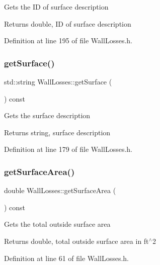 Gets the ID of surface description \begin{DoxyReturn}{Returns}
double, ID of surface description 
\end{DoxyReturn}


Definition at line 195 of file Wall\+Losses.\+h.

\mbox{\label{class_wall_losses_a10f5de20dc6fead726adbf62a9c49b09}} 
\subsubsection{\texorpdfstring{get\+Surface()}{getSurface()}}
{\footnotesize\ttfamily std\+::string Wall\+Losses\+::get\+Surface (\begin{DoxyParamCaption}{ }\end{DoxyParamCaption}) const\hspace{0.3cm}{\ttfamily [inline]}}

Gets the surface description \begin{DoxyReturn}{Returns}
string, surface description 
\end{DoxyReturn}


Definition at line 179 of file Wall\+Losses.\+h.

\mbox{\label{class_wall_losses_ad4d3aa549cc7ab19e927823dbafed973}} 
\subsubsection{\texorpdfstring{get\+Surface\+Area()}{getSurfaceArea()}}
{\footnotesize\ttfamily double Wall\+Losses\+::get\+Surface\+Area (\begin{DoxyParamCaption}{ }\end{DoxyParamCaption}) const\hspace{0.3cm}{\ttfamily [inline]}}

Gets the total outside surface area \begin{DoxyReturn}{Returns}
double, total outside surface area in ft$^\wedge$2 
\end{DoxyReturn}


Definition at line 61 of file Wall\+Losses.\+h.

